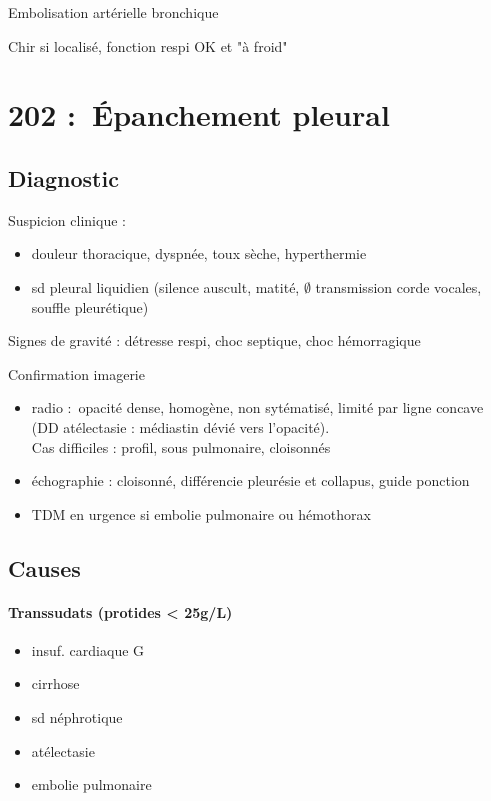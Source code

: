 Embolisation artérielle bronchique

Chir si localisé, fonction respi OK et "à froid"

\section{202 : Épanchement pleural}%
\label{sec:epanchement_pleural}

\subsection{Diagnostic}
Suspicion clinique :
\begin{itemize}
\item douleur thoracique, dyspnée, toux sèche, hyperthermie
\item sd pleural liquidien (silence auscult, matité, $\emptyset$ transmission
  corde vocales, souffle pleurétique)
\end{itemize}
Signes de gravité : détresse respi, choc septique, choc hémorragique

Confirmation imagerie
\begin{itemize}
\item radio : opacité dense, homogène, non sytématisé, limité par ligne
  concave (DD atélectasie : médiastin dévié vers l'opacité). \\
  Cas difficiles : profil, sous pulmonaire, cloisonnés
\item échographie : cloisonné, différencie pleurésie et collapus, guide ponction
\item TDM en urgence si embolie pulmonaire ou hémothorax
\end{itemize}

\subsection{Causes}
\paragraph{Transsudats (protides < 25g/L)}
\begin{itemize}
\item insuf. cardiaque G
\item cirrhose
\item sd néphrotique
\item atélectasie
\item embolie pulmonaire
\end{itemize}

